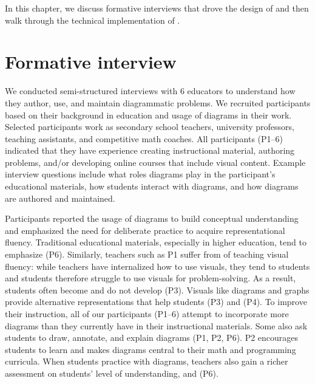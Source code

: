 In this chapter, we discuss formative interviews that drove the design of \Edgeworth{} and then walk through the technical implementation of \Edgeworth.

\section{Formative interview}

\label{sec:edgeworth-formative}

We conducted semi-structured interviews with 6 educators to understand how they author, use, and maintain diagrammatic problems. We recruited participants based on their background in education and usage of diagrams in their work. Selected participants work as secondary school teachers, university professors, teaching assistants, and competitive math coaches. All participants (P1--6) indicated that they have experience creating instructional material, authoring problems, and/or developing online courses that include visual content. Example interview questions include what roles diagrams play in the participant's educational materials, how students interact with diagrams, and how diagrams are authored and maintained. 

Participants reported the usage of diagrams to build conceptual understanding and emphasized the need for deliberate practice to acquire representational fluency. Traditional educational materials, especially in higher education, tend to emphasize  (P6).  Similarly, teachers such as P1 suffer from  of teaching visual fluency: while teachers have internalized how to use visuals, they tend to  students and students therefore struggle to use visuals for problem-solving.  As a result, students often become  and do not develop  (P3). Visuals like diagrams and graphs provide alternative representations that help students  (P3) and  (P4). To improve their instruction, all of our participants (P1--6) attempt to incorporate more diagrams than they currently have in their instructional materials. Some also ask students to draw, annotate, and explain diagrams (P1, P2, P6). P2 encourages students to learn  and makes diagrams central to their math and programming curricula. When students practice with diagrams, teachers also gain a richer assessment on students' level of understanding, and  (P6).


